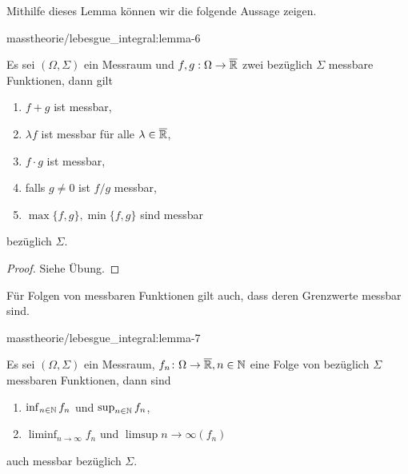 \par
Mithilfe dieses Lemma können wir die folgende Aussage zeigen.
\begin{lemma}{}{masstheorie/lebesgue_integral:lemma-6}



\par
Es sei \((\Omega,\Sigma)\) ein Messraum und \(f,g:\Omega\to\overline{\mathbb{R}}\) zwei bezüglich \(\Sigma\) messbare Funktionen, dann gilt
\begin{enumerate}

\item {} 
\par
\(f+g\) ist messbar,

\item {} 
\par
\(\lambda f\) ist messbar für alle \(\lambda\in\overline{\mathbb{R}}\),

\item {} 
\par
\(f\cdot g\) ist messbar,

\item {} 
\par
falls \(g\neq 0\) ist \(f/g\) messbar,

\item {} 
\par
\(\max\{f,g\}, \min\{f,g\}\) sind messbar

\end{enumerate}

\par
bezüglich \(\Sigma\).
\end{lemma}

\begin{proof}
 Siehe Übung.
\end{proof}

\par
Für Folgen von messbaren Funktionen gilt auch, dass deren Grenzwerte messbar sind.
\begin{lemma}{}{masstheorie/lebesgue_integral:lemma-7}



\par
Es sei \((\Omega,\Sigma)\) ein Messraum, \(f_n \colon \Omega\to\overline{\mathbb{R}},n\in\mathbb{N}\) eine Folge von bezüglich \(\Sigma\) messbaren Funktionen, dann sind
\begin{enumerate}

\item {} 
\par
\(\inf_{n\in\mathbb{N}} f_n\) und \(\sup_{n\in\mathbb{N}} f_n\),

\item {} 
\par
\(\liminf_{n\to\infty} f_n\) und \(\limsup{n\to\infty} (f_n)\)

\end{enumerate}

\par
auch messbar bezüglich \(\Sigma\).
\end{lemma}

